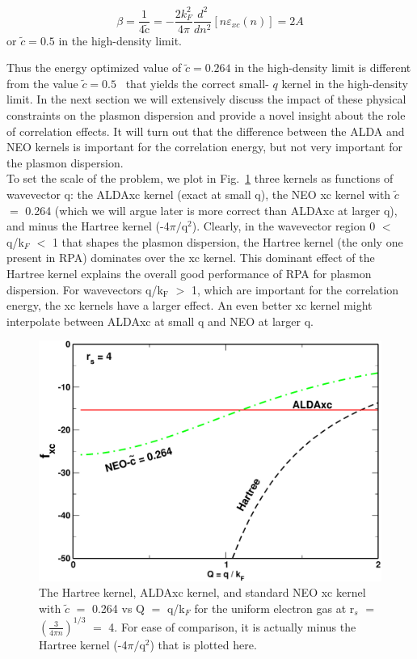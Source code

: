 \documentclass[aps,amsmath,amssymb, preprint, 12pt]{revtex4-1}
\begin{document}
\begin{equation}
 \beta =\frac{1}{4\widetilde{\text{c}}}   =-\frac{2k_{F}^2}{4 \pi }\frac{d^{2}}{dn^{2}} [ n \varepsilon _{xc} ( n )  ] = 2A
\end{equation}
or   \( \widetilde{c}=0.5 \)  in the high-density limit.

Thus the energy optimized value of  \( \widetilde{c}=0.264 \)  in the high-density limit is different from the value  \( \widetilde{c}=0.5 \) \  that yields the correct small- \( q \)  kernel in the high-density limit. In the next section we will extensively discuss the impact of these physical constraints on the plasmon dispersion and provide a novel insight about the role of correlation effects. It will turn out that the difference between the ALDA and NEO kernels is important for the correlation energy, but not very important for the plasmon dispersion.\\

To set the scale of the problem, we plot in Fig.~\ref{fig0} three kernels as functions of wavevector q: the ALDAxc kernel (exact at small q), the NEO xc kernel with $\widetilde{c}$ $=$ 0.264 (which we will argue later is more correct than ALDAxc at larger q), and minus the Hartree kernel (-4$\pi/\text{q}^2$). Clearly, in the wavevector region 0 $<$ q/k$_F$ $<$ 1 that shapes the plasmon dispersion, the Hartree kernel (the only one present in RPA) dominates over the xc kernel. This dominant effect of the Hartree kernel explains the overall good performance of RPA for plasmon dispersion. For wavevectors q/k$_\text{F}$ $>$ 1, which are important for the correlation energy, the xc kernels have a larger effect. An even better xc kernel might interpolate between ALDAxc at small q and NEO at larger q.

\begin{figure}[h!]
	\includegraphics[scale=0.4]{figure_1.pdf}
	\caption{The Hartree kernel, ALDAxc kernel, and standard NEO xc kernel with $\widetilde{c}$ $=$ 0.264 vs Q $=$ q/k$_F$ for the uniform electron gas at r$_s$ $=$ $(\frac{3}{4\pi n})^{1/3}$ $=$ 4. For ease of comparison, it is actually minus the Hartree kernel (-4$\pi/\text{q}^2$) that is plotted here.}
	\label{fig0}
\end{figure}
\end{document}
